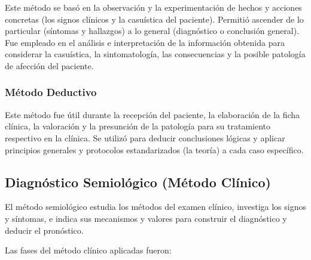	Este método se basó en la observación y la experimentación de hechos y acciones concretas (los signos clínicos y la casuística del paciente). Permitió ascender de lo particular (síntomas y hallazgos) a lo general (diagnóstico o conclusión general). Fue empleado en el análisis e interpretación de la información obtenida para considerar la casuística, la sintomatología, las consecuencias y la posible patología de afección del paciente.

	\subsubsection{Método Deductivo}

	Este método fue útil durante la recepción del paciente, la elaboración de la ficha clínica, la valoración y la presunción de la patología para su tratamiento respectivo en la clínica. Se utilizó para deducir conclusiones lógicas y aplicar principios generales y protocolos estandarizados (la teoría) a cada caso específico.

	\subsection{Diagnóstico Semiológico (Método Clínico)}

	El método semiológico estudia los métodos del examen clínico, investiga los signos y síntomas, e indica sus mecanismos y valores para construir el diagnóstico y deducir el pronóstico.

	Las fases del método clínico aplicadas fueron:


